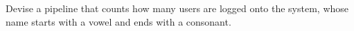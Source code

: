     Devise a pipeline that counts how many users are logged onto
    the system, whose name starts with a vowel and ends with a
    consonant.
